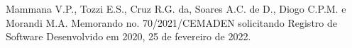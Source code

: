 \documentclass[
12pt,		%
openright,	%
twoside,  %
a4paper,			%
chapter=TITLE,		%
english,			%
french,				%
spanish,			%
brazil				%
]{USPSC-classe/USPSC}
\begin{document}
\begin{flushleft}
\begin{flushleft}
\begin{flushleft}
\begin{flushleft}
\begin{flushleft}
\begin{flushleft}
\begin{flushleft}
\begin{flushleft}
\begin{flushleft}
\begin{flushleft}
[MAMMANA et al., 2022] Mammana V.P., Tozzi E.S., Cruz R.G. da, Soares A.C. de D., Diogo C.P.M. e Morandi M.A. Memorando no. 70/2021/CEMADEN solicitando Registro de Software Desenvolvido em 2020, 25 de fevereiro de 2022.
\end{flushleft}


\end{flushleft}


\end{flushleft}


\end{flushleft}


\end{flushleft}


\end{flushleft}


\end{flushleft}


\end{flushleft}


\end{flushleft}


\end{flushleft}
\end{document}
